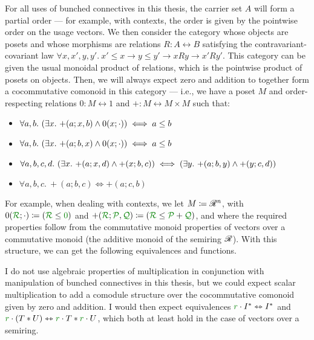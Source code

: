 For all uses of bunched connectives in this thesis, the carrier set $A$ will
form a partial order --- for example, with contexts, the order is given by the
pointwise order on the usage vectors.
We then consider the category whose objects are posets and whose morphisms are
relations $R : A \rel B$ satisfying the contravariant-covariant law
$\forall x,x',y,y'.~x' \leq x \to y \leq y' \to xRy \to x'Ry'$.
This category can be given the usual monoidal product of relations, which is
the pointwise product of posets on objects.
Then, we will always expect zero and addition to together form a cocommutative
comonoid in this category --- i.e., we have a poset $M$ and order-respecting
relations $0 : M \rel 1$ and ${+} : M \rel M \times M$ such that:

\begin{itemize}
  \item $\forall a,b.~\plr{\exists x.~{+}(a; x, b) \wedge 0(x; {\cdot})}
    \iff a \leq b$
  \item $\forall a,b.~\plr{\exists x.~{+}(a; b, x) \wedge 0(x; {\cdot})}
    \iff a \leq b$
  \item $\forall a,b,c,d.~\plr{\exists x.~{+}(a; x, d) \wedge {+}(x; b, c)}
    \iff \plr{\exists y.~{+}(a; b, y) \wedge {+}(y; c, d)}$
  \item $\forall a,b,c.~{+}(a; b, c) \iff {+}(a; c, b)$
\end{itemize}

For example, when dealing with contexts, we let $M \coloneqq \mathscr R^n$, with
$0(\grR; {\cdot}) \coloneqq \plr{\grR \leq \gr0}$ and
${+}(\grR; \grP, \grQ) \coloneqq \plr{\grR \leq \grP + \grQ}$, and where
the required properties follow from the commutative monoid properties of vectors
over a commutative monoid (the additive monoid of the semiring $\mathscr R$).
With this structure, we can get the following equivalences and functions.


I do not use algebraic properties of multiplication in conjunction with
manipulation of bunched connectives in this thesis, but we could expect
scalar multiplication
to add a comodule structure over the cocommutative comonoid
given by zero and addition.
I would then expect equivalences $\gr r \cdot I^* \leftrightarrowtriangle I^*$
and $\gr r \cdot \plr{T \sep U} \leftrightarrowtriangle
\gr r \cdot T \sep \gr r \cdot U$, which both at least hold in the case of
vectors over a semiring.
